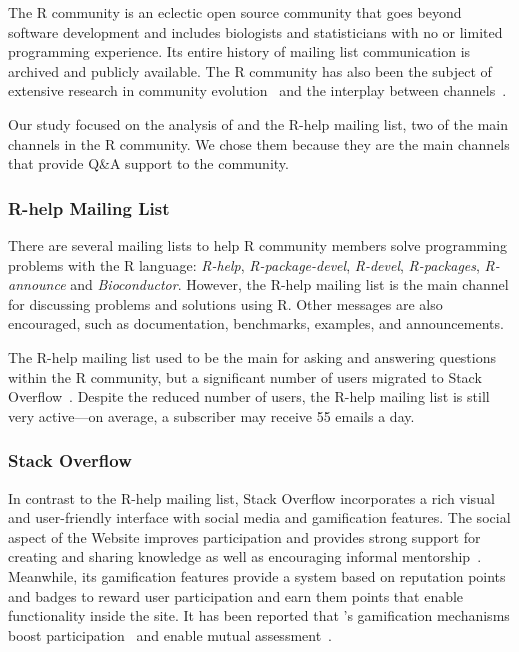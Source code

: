     The R community is an eclectic open source community that goes beyond software development 
    and includes biologists and statisticians with no or limited programming experience.
    Its entire history of mailing list communication is archived and publicly available.
    The R community has also been the subject of extensive research in community evolution~\cite{German2013,Vasi1escu2014PhD} and the interplay between channels~\cite{Vasilescu2014c}.

    Our study focused on the analysis of \SO and the R-help mailing list, two of the main channels in the R community.
    We chose them because they are the main channels that provide Q\&A support to the community.

\subsubsection{R-help Mailing List}
    There are several mailing lists to help R community members solve programming problems with the R language: \emph{R-help}, \emph{R-package-devel}, \emph{R-devel}, \emph{R-packages}, \emph{R-announce} and \emph{Bioconductor}. However, the R-help mailing list is the main channel for discussing problems and solutions using R.  Other messages are also encouraged, such as documentation, benchmarks, examples, and announcements.

    The R-help mailing list used to be the main \channel for asking and answering questions within the R community, but a significant number of users migrated to Stack Overflow~\cite{Vasilescu2014c}.
    Despite the reduced number of users, the R-help mailing list is still very active---on average, a subscriber may receive 55 emails a day.

\subsubsection{Stack Overflow}
\label{subsec:Rtag}

    In contrast to the R-help mailing list, Stack Overflow incorporates a rich visual and user-friendly interface with social media and gamification features.
    The social aspect of the Website improves participation and provides strong support for creating and sharing knowledge as well as encouraging informal mentorship~\cite{Jenkins2009, Storey2014}.
    Meanwhile, its gamification features provide a system based on reputation points and badges to reward user participation and earn them points that enable functionality inside the site.
    It has been reported that \SO's gamification mechanisms boost participation~\cite{Vasi1escu2014PhD} and enable mutual assessment~\cite{Singer2013}.


